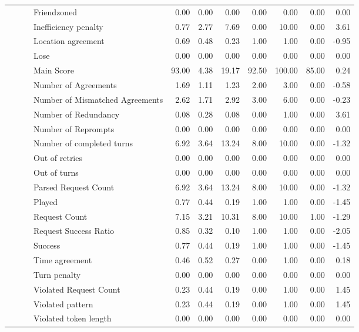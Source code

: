 \begin{tabular}{llllrrrrrrr}
 &  &  & Friendzoned & 0.00 & 0.00 & 0.00 & 0.00 & 0.00 & 0.00 & 0.00 \\
 &  &  & Inefficiency penalty & 0.77 & 2.77 & 7.69 & 0.00 & 10.00 & 0.00 & 3.61 \\
 &  &  & Location agreement & 0.69 & 0.48 & 0.23 & 1.00 & 1.00 & 0.00 & -0.95 \\
 &  &  & Lose & 0.00 & 0.00 & 0.00 & 0.00 & 0.00 & 0.00 & 0.00 \\
 &  &  & Main Score & 93.00 & 4.38 & 19.17 & 92.50 & 100.00 & 85.00 & 0.24 \\
 &  &  & Number of Agreements & 1.69 & 1.11 & 1.23 & 2.00 & 3.00 & 0.00 & -0.58 \\
 &  &  & Number of Mismatched Agreements & 2.62 & 1.71 & 2.92 & 3.00 & 6.00 & 0.00 & -0.23 \\
 &  &  & Number of Redundancy & 0.08 & 0.28 & 0.08 & 0.00 & 1.00 & 0.00 & 3.61 \\
 &  &  & Number of Reprompts & 0.00 & 0.00 & 0.00 & 0.00 & 0.00 & 0.00 & 0.00 \\
 &  &  & Number of completed turns & 6.92 & 3.64 & 13.24 & 8.00 & 10.00 & 0.00 & -1.32 \\
 &  &  & Out of retries & 0.00 & 0.00 & 0.00 & 0.00 & 0.00 & 0.00 & 0.00 \\
 &  &  & Out of turns & 0.00 & 0.00 & 0.00 & 0.00 & 0.00 & 0.00 & 0.00 \\
 &  &  & Parsed Request Count & 6.92 & 3.64 & 13.24 & 8.00 & 10.00 & 0.00 & -1.32 \\
 &  &  & Played & 0.77 & 0.44 & 0.19 & 1.00 & 1.00 & 0.00 & -1.45 \\
 &  &  & Request Count & 7.15 & 3.21 & 10.31 & 8.00 & 10.00 & 1.00 & -1.29 \\
 &  &  & Request Success Ratio & 0.85 & 0.32 & 0.10 & 1.00 & 1.00 & 0.00 & -2.05 \\
 &  &  & Success & 0.77 & 0.44 & 0.19 & 1.00 & 1.00 & 0.00 & -1.45 \\
 &  &  & Time agreement & 0.46 & 0.52 & 0.27 & 0.00 & 1.00 & 0.00 & 0.18 \\
 &  &  & Turn penalty & 0.00 & 0.00 & 0.00 & 0.00 & 0.00 & 0.00 & 0.00 \\
 &  &  & Violated Request Count & 0.23 & 0.44 & 0.19 & 0.00 & 1.00 & 0.00 & 1.45 \\
 &  &  & Violated pattern & 0.23 & 0.44 & 0.19 & 0.00 & 1.00 & 0.00 & 1.45 \\
 &  &  & Violated token length & 0.00 & 0.00 & 0.00 & 0.00 & 0.00 & 0.00 & 0.00 \\

\end{tabular}
